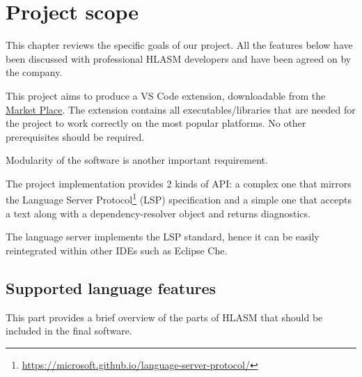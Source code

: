 \chapter{Project scope}

This chapter reviews the specific goals of our project.
All the features below have been discussed with professional HLASM developers and have been agreed on by the company.

This project aims to produce a VS Code extension, downloadable from the  \href{https://marketplace.visualstudio.com/}{Market Place}. The extension contains all executables/libraries that are needed for the project to work correctly on the most popular platforms. No other prerequisites should be required.

Modularity of the software is another important requirement. 

The project implementation provides 2 kinds of API: a complex one that mirrors the Language Server Protocol\footnote{\url{https://microsoft.github.io/language-server-protocol/}} (LSP) specification and a simple one that accepts a text along with a dependency-resolver object and returns diagnostics. 

The language server implements the LSP standard, hence it can be easily reintegrated within other IDEs such as Eclipse Che.

\section{Supported language features}
\label{LSPFeatures}
This part provides a brief overview of the parts of HLASM that should be included in the final software.

